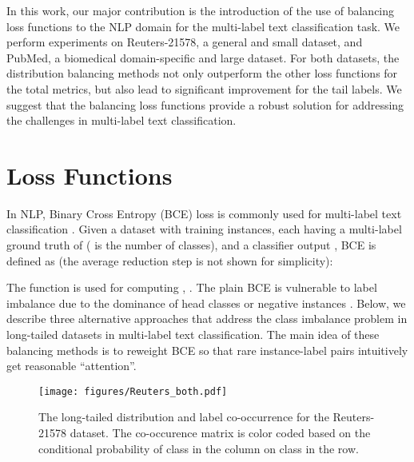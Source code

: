 \documentclass[11pt]{article}
\begin{document}
In this work, our major contribution is the introduction of the use of balancing loss functions to the NLP domain for the multi-label text classification task. We perform experiments on Reuters-21578, a general and small dataset, and PubMed, a biomedical domain-specific and large dataset. For both datasets, the distribution balancing methods not only outperform the other loss functions for the total metrics, but also lead to significant improvement for the tail labels. We suggest that the balancing loss functions provide a robust solution for addressing the challenges in multi-label text classification. 




































\section{Loss Functions}
\label{section:loss_functions}

In NLP, Binary Cross Entropy (BCE) loss is commonly used for  multi-label text classification \citep{Bengio-review}. Given a dataset  with  training instances, each having a multi-label ground truth of  ( is the number of classes), and a classifier output , BCE is defined as (the average reduction step is not shown for simplicity):


\small
  
\normalsize

The  function is used for computing ,   . The plain BCE is vulnerable to label imbalance due to the dominance of head classes or negative instances   \citep{BCE_CV}. Below, we describe three alternative approaches that address the class imbalance problem in long-tailed datasets in multi-label text classification. The main idea of these balancing methods is to reweight BCE so that rare instance-label pairs intuitively get reasonable “attention”.


\begin{figure}[t]\centering
    \texttt{[image: figures/Reuters\_both.pdf]}
    \caption{The long-tailed distribution and label co-occurrence for the Reuters-21578 dataset. 
The co-occurence matrix is color coded based on the conditional probability  of class in the  column on class in the  row.}\label{fig:longtailed}\end{figure}
\end{document}

